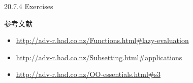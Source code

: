 \documentclass[
  ignorenonframetext,
]{beamer}
\providecommand{\tightlist}{%
  \setlength{\itemsep}{0pt}\setlength{\parskip}{0pt}}
\begin{document}
\begin{frame}{20.7.4 Exercises}
\protect\hypertarget{exercises-3}{}
\end{frame}

\begin{frame}{参考文献}
\protect\hypertarget{ux53c2ux8003ux6587ux732e}{}
\begin{itemize}
\tightlist
\item
  \url{http://adv-r.had.co.nz/Functions.html\#lazy-evaluation}
\item
  \url{http://adv-r.had.co.nz/Subsetting.html\#applications}
\item
  \url{http://adv-r.had.co.nz/OO-essentials.html\#s3}
\end{itemize}
\end{frame}
\end{document}
